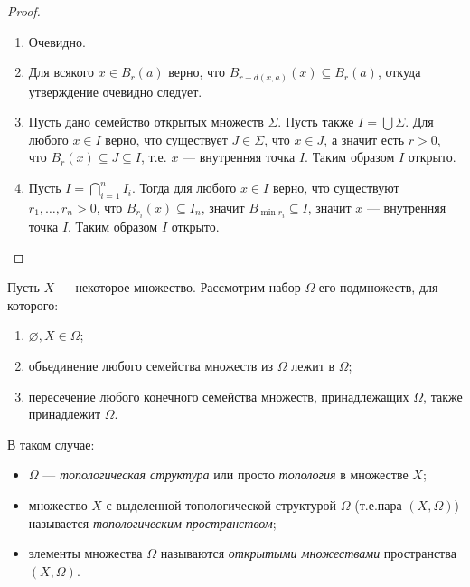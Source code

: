 \documentclass[12pt,a4paper]{article}
\begin{document}
    \begin{proof}\ 
        \begin{enumerate}
            \item Очевидно.
            \item Для всякого $x \in B_r(a)$ верно, что $B_{r-d(x, a)}(x) \subseteq B_r(a)$, откуда утверждение очевидно следует.
            \item Пусть дано семейство открытых множеств $\Sigma$. Пусть также $I = \bigcup \Sigma$. Для любого $x \in I$ верно, что существует $J \in \Sigma$, что $x \in J$, а значит есть $r > 0$, что $B_r(x) \subseteq J \subseteq I$, т.е. $x$ --- внутренняя точка $I$. Таким образом $I$ открыто.
            \item Пусть $I = \bigcap_{i = 1}^n I_i$. Тогда для любого $x \in I$ верно, что существуют $r_1, \dots, r_n > 0$, что $B_{r_i}(x) \subseteq I_n$, значит $B_{\min r_i} \subseteq I$, значит $x$ --- внутренняя точка $I$. Таким образом $I$ открыто.
        \end{enumerate}
    \end{proof}

    \begin{definition}
        Пусть $X$ --- некоторое множество. Рассмотрим набор $\Omega$ его подмножеств, для которого:
        \begin{enumerate}
            \item $\varnothing, X \in \Omega$;
            \item объединение любого семейства множеств из $\Omega$ лежит в $\Omega$;
            \item пересечение любого конечного семейства множеств, принадлежащих $\Omega$, также принадлежит $\Omega$.
        \end{enumerate}
        В таком случае:
        \begin{itemize}
            \item $\Omega$ --- \emph{топологическая структура} или просто \emph{топология} в множестве $X$;
            \item множество $X$ с выделенной топологической структурой $\Omega$ (т.е.пара $(X, \Omega)$) называется \emph{топологическим пространством};
            \item элементы множества $\Omega$ называются \emph{открытыми множествами} пространства $(X, \Omega)$.
        \end{itemize}
    \end{definition}
\end{document}
